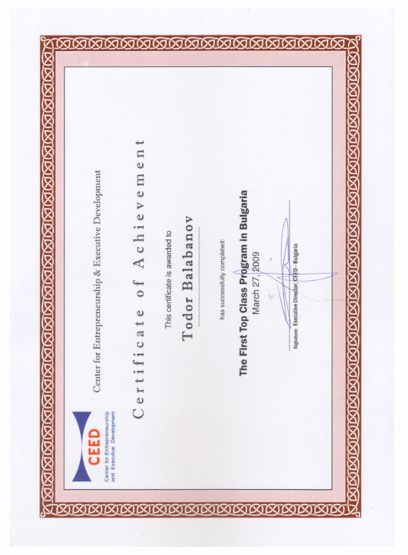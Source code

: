 \documentclass[english,a4paper]{europasscv}
\begin{document}
\includegraphics[width=\textwidth,height=\textheight,keepaspectratio]{CEED2009}
\end{document}
